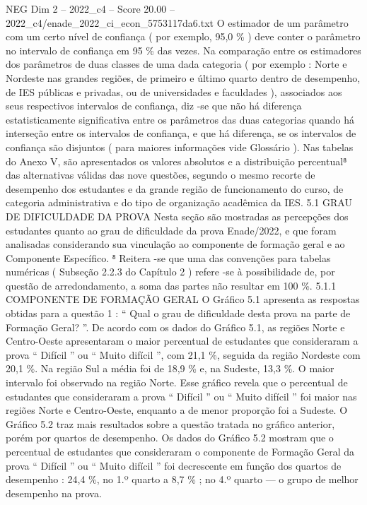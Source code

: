 \begin{textsample}{NEG Dim 2 – 2022\_c4 – Score 20.00 – 2022\_c4/enade\_2022\_ci\_econ\_5753117da6.txt}
O estimador de um parâmetro com um certo nível de confiança ( por exemplo, 95,0 \% ) deve conter o parâmetro no intervalo de confiança em 95 \% das vezes.
Na comparação entre os estimadores dos parâmetros de duas classes de uma dada categoria ( por exemplo : Norte e Nordeste nas grandes regiões, de primeiro e último quarto dentro de desempenho, de IES públicas e privadas, ou de universidades e faculdades ), associados aos seus respectivos intervalos de confiança, diz -se que não há diferença estatisticamente significativa entre os parâmetros das duas categorias quando há interseção entre os intervalos de confiança, e que há diferença, se os intervalos de confiança são disjuntos ( para maiores informações vide Glossário ).
Nas tabelas do Anexo V, são apresentados os valores absolutos e a distribuição percentual⁸ das alternativas válidas das nove questões, segundo o mesmo recorte de desempenho dos estudantes e da grande região de funcionamento do curso, de categoria administrativa e do tipo de organização acadêmica da IES. 5.1 GRAU DE DIFICULDADE DA PROVA Nesta seção são mostradas as percepções dos estudantes quanto ao grau de dificuldade da prova Enade/2022, e que foram analisadas considerando sua vinculação ao componente de formação geral e ao Componente Específico. ⁸ Reitera -se que uma das convenções para tabelas numéricas ( Subseção 2.2.3 do Capítulo 2 ) refere -se à possibilidade de, por questão de arredondamento, a soma das partes não resultar em 100 \%. 5.1.1 COMPONENTE DE FORMAÇÃO GERAL O Gráfico 5.1 apresenta as respostas obtidas para a questão 1 : “ Qual o grau de dificuldade desta prova na parte de Formação Geral? ”.
De acordo com os dados do Gráfico 5.1, as regiões Norte e Centro-Oeste apresentaram o maior percentual de estudantes que consideraram a prova “ Difícil ” ou “ Muito difícil ”, com 21,1 \%, seguida da região Nordeste com 20,1 \%.
Na região Sul a média foi de 18,9 \% e, na Sudeste, 13,3 \%.
O maior intervalo foi observado na região Norte.
Esse gráfico revela que o percentual de estudantes que consideraram a prova “ Difícil ” ou “ Muito difícil ” foi maior nas regiões Norte e Centro-Oeste, enquanto a de menor proporção foi a Sudeste.
O Gráfico 5.2 traz mais resultados sobre a questão tratada no gráfico anterior, porém por quartos de desempenho.
Os dados do Gráfico 5.2 mostram que o percentual de estudantes que consideraram o componente de Formação Geral da prova “ Difícil ” ou “ Muito difícil ” foi decrescente em função dos quartos de desempenho : 24,4 \%, no 1.º quarto a 8,7 \% ; no 4.º quarto — o grupo de melhor desempenho na prova.

\end{textsample}
